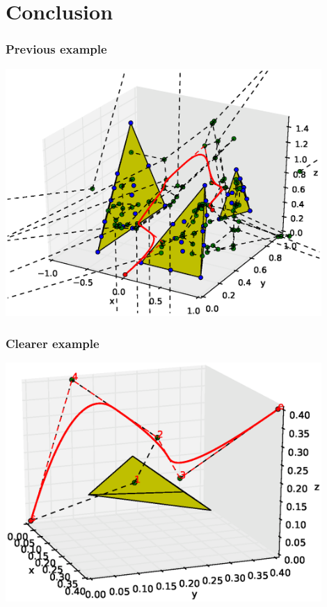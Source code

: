 \section{Conclusion}

\begin{frame}
  \frametitle{Previous example}
  \begin{center}
    \includegraphics[width=0.9\textwidth]{img/screenFinal.eps}
  \end{center}
\end{frame}

\begin{frame}
  \frametitle{Clearer example}
  \begin{center}
    \includegraphics[width=0.9\textwidth]{img/screenFinal2.eps}
  \end{center}
\end{frame}

